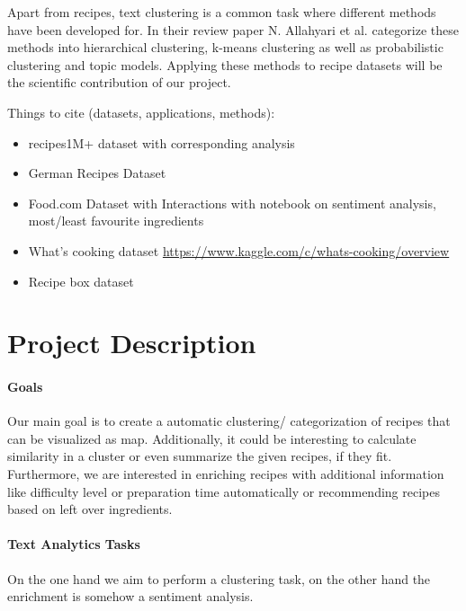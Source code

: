\documentclass[
     12pt,         %
     a4paper,      %
     BCOR10mm,     %
     DIV14,        %
     ]{article}
\begin{document}
Apart from recipes, text clustering is a common task where different methods have been developed for. In their review paper N. Allahyari et al. categorize these methods into hierarchical clustering, k-means clustering as well as probabilistic clustering and topic models. Applying these methods to recipe datasets will be the scientific contribution of our project.


Things to cite (datasets, applications, methods):
\begin{itemize}
  \item recipes1M+ dataset \cite{marin2019recipe1m} with corresponding analysis \cite{8099810}
  \item German Recipes Dataset \cite{germanrecipesdataset}
  \item Food.com Dataset with Interactions \cite{foodcominteractions} with notebook on sentiment analysis, most/least favourite ingredients
  \item What's cooking dataset \url{https://www.kaggle.com/c/whats-cooking/overview}
  \item Recipe box dataset \cite{recipebox}
\end{itemize}

\section{Project Description}

\paragraph{Goals} Our main goal is to create a automatic clustering/ categorization  of recipes that can be visualized as map.  Additionally, it could be interesting to calculate similarity in a cluster or even summarize the given recipes, if they fit. Furthermore, we are interested in enriching recipes with 
additional information like difficulty level or preparation time automatically or recommending recipes based on left over ingredients.

\paragraph{Text Analytics Tasks} On the one hand we aim to perform a clustering task, on the other hand the enrichment  is somehow a sentiment analysis. %
\end{document}

